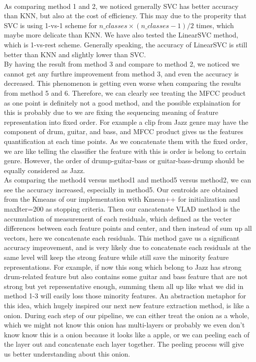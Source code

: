 \documentclass[final]{siamltexmm}
\begin{document}
\\As comparing method 1 and 2, we noticed generally SVC has better accuracy than KNN, but also at the cost of efficiency. This may due to the properity that SVC is using 1-vs-1 scheme for $n\_classes\times(n\_classes-1)/2$ times, which maybe more delicate than KNN. We have also tested the LinearSVC method, which is 1-vs-rest scheme. Generally speaking, the accuracy of LinearSVC is still better than KNN and slightly lower than SVC.
\\By having the result from method 3 and compare to method 2, we noticed we cannot get any furthre improvement from method 3, and even the accuracy is decreased. This phenomenon is getting even worse when comparing the results from method 5 and 6. Therefore, we can clearly see treating the MFCC product as one point is definitely not a good method, and the possible explaination for this is probably due to we are fixing the sequencing meaning of feature representation into fixed order. For example a clip from Jazz genre may have the component of drum, guitar, and bass, and MFCC product gives us the features quantification at each time points. As we concatenate them with the fixed order, we are like telling the classifier the feature with this is order is belong to certain genre. However, the order of drump-guitar-bass or guitar-bass-drump should be equally considered as Jazz.
\\As comparing the method4 versus method1 and method5 versus method2, we can see the accuracy increased, especially in method5. Our centroids are obtained from the Kmeans of our implementation with Kmean++ for initialization and maxIter=200 as stopping criteria. Then our cancatenate VLAD method is the accumulation of measurement of each residuals, which defined as the vecter differences between each feature points and center, and then instead of sum up all vectors, here we concatenate each residuals. This method gave us a significant accuracy improvement, and is very likely due to concatenate each residuals at the same level will keep the strong feature while still save the minority feature representations. For example, if now this song which belong to Jazz has strong drum-related feature but also contains some guitar and bass feature that are not strong but yet representative enough, summing them all up like what we did in method 1-3 will easily loss those minority features. An abstraction metaphor for this idea, which hugely inspired our next new feature extraction method, is like a onion. During each step of our pipeline, we can either treat the onion as a whole, which we might not know this onion has multi-layers or probably we even don't know know this is a onion because it looks like a apple, or we can peeling each of the layer out and concatenate each layer together. The peeling process will give us better understanding about this onion.
\end{document}
